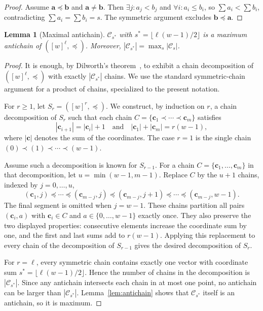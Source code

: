 \documentclass[11pt,a4paper]{article}
\newtheorem{lemma}[theorem]{Lemma}
\newcommand{\cC}{\mathcal{C}}
\begin{document}
\begin{proof}
Assume $\mathbf{a} \preceq \mathbf{b}$ and $\mathbf{a} \neq \mathbf{b}$. Then $\exists j: a_j < b_j$ and $\forall i: a_i \le b_i$, so $\sum a_i < \sum b_i$, contradicting $\sum a_i = \sum b_i = s$. The symmetric argument excludes $\mathbf{b} \preceq \mathbf{a}$.
\end{proof}

\begin{lemma}[Maximal antichain]
\label{lem:maxantichain}
$\cC_{s^*}$ with $s^* = \lfloor \ell(w-1)/2\rfloor$ is a maximum antichain of $([w]^\ell, \preceq)$. Moreover, $|\cC_{s^*}| = \max_s |\cC_s|$.
\end{lemma}

\begin{proof}
It is enough, by Dilworth's theorem~\cite{dilworth}, to exhibit a chain decomposition of $([w]^\ell,\preceq)$ with exactly $|\cC_{s^*}|$ chains. We use the standard symmetric-chain argument for a product of chains, specialized to the present notation.

For $r \ge 1$, let $S_r=([w]^r,\preceq)$. We construct, by induction on $r$, a chain decomposition of $S_r$ such that each chain $C=\{\mathbf{c}_1 \prec \cdots \prec \mathbf{c}_m\}$ satisfies
\[
|\mathbf{c}_{i+1}|=|\mathbf{c}_i|+1
\quad\text{and}\quad
|\mathbf{c}_1|+|\mathbf{c}_m|=r(w-1),
\]
where $|\mathbf{c}|$ denotes the sum of the coordinates. The case $r=1$ is the single chain $(0)\prec(1)\prec\cdots\prec(w-1)$.

Assume such a decomposition is known for $S_{r-1}$. For a chain
$C=\{\mathbf{c}_1,\ldots,\mathbf{c}_m\}$ in that decomposition, let
$u=\min(w-1,m-1)$. Replace $C$ by the $u+1$ chains, indexed by
$j=0,\ldots,u$,
\[
(\mathbf{c}_1,j)\preceq \cdots \preceq
(\mathbf{c}_{m-j},j)\preceq
(\mathbf{c}_{m-j},j+1)\preceq \cdots \preceq
(\mathbf{c}_{m-j},w-1).
\]
The final segment is omitted when $j=w-1$.
These chains partition all pairs $(\mathbf{c}_i,a)$ with
$\mathbf{c}_i\in C$ and $a\in\{0,\ldots,w-1\}$ exactly once. They also preserve the two displayed properties: consecutive elements increase the coordinate sum by one, and the first and last sums add to $r(w-1)$. Applying this replacement to every chain of the decomposition of $S_{r-1}$ gives the desired decomposition of $S_r$.

For $r=\ell$, every symmetric chain contains exactly one vector with coordinate sum $s^*=\lfloor \ell(w-1)/2\rfloor$. Hence the number of chains in the decomposition is $|\cC_{s^*}|$. Since any antichain intersects each chain in at most one point, no antichain can be larger than $|\cC_{s^*}|$. Lemma~\ref{lem:antichain} shows that $\cC_{s^*}$ itself is an antichain, so it is maximum.
\end{proof}
\end{document}
